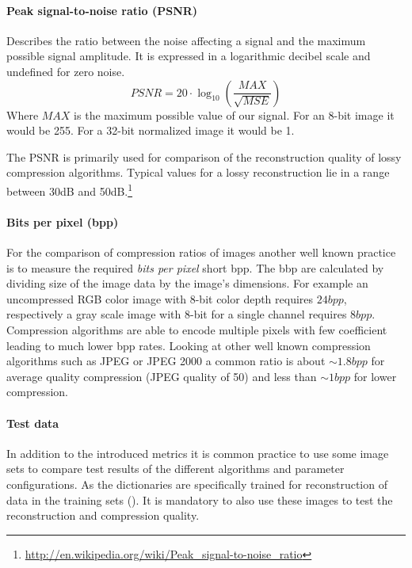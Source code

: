 \paragraph{Peak signal-to-noise ratio (PSNR)} Describes the ratio between the
noise affecting a signal and the maximum possible signal amplitude. It is
expressed in a logarithmic decibel scale and undefined for zero
noise.
\begin{equation*}
 PSNR = 20 \cdot \log_{10} \left(\frac{MAX}{\sqrt{MSE}}\right)
\end{equation*}
Where $MAX$ is the maximum possible value of our signal. For an 8-bit
image it would be 255. For a 32-bit normalized image it would be 1.

The PSNR is primarily used for comparison of the reconstruction quality of
lossy compression algorithms. Typical values for a lossy reconstruction lie in
a range between 30dB and 
50dB.\footnote{\url{http://en.wikipedia.org/wiki/Peak_signal-to-noise_ratio}}

\paragraph{Bits per pixel (bpp)} 
For the comparison of compression ratios of images another well known practice
is to measure the required \emph{bits per pixel} short bpp. The bbp are
calculated by dividing size of the image data by the image's dimensions. For
example an uncompressed RGB color image with 8-bit color depth requires
$24bpp$, respectively a gray scale image with 8-bit for a single
channel requires $8bpp$. Compression algorithms are able to encode
multiple pixels with few coefficient leading to much lower bpp rates.
Looking at other well known compression algorithms such as JPEG or
JPEG 2000 a common ratio is about $\sim1.8bpp$ for average
quality compression (JPEG quality of 50) and less than $\sim1bpp$ for
lower compression.


\paragraph{Test data}
In addition to the introduced metrics it is common practice to use some image
sets to compare test results of the different algorithms and parameter
configurations. As the dictionaries are specifically trained for
reconstruction of data in the training sets
(). It is mandatory to also use
these images to test the reconstruction and compression quality. 

